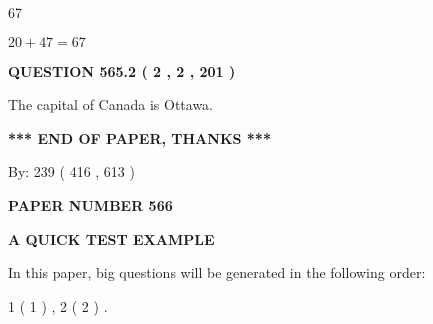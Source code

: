 \documentclass[12pt]{article}
\begin{document}
67
 
 
 
 
\noindent{}

$ %
20 +  %
47=   %
67$
 
 
  
\vspace{0.2in}
  
{\textbf{\Large{QUESTION
565.2 
 ( 2 , 2 , 201 )
}}}
  
  
 
 
\noindent{}
 
 
The capital of Canada is Ottawa.
 
 
 
 
   
   
 \vspace{0.2in}
 
   
   
   
   
\vspace{1.0in} 
{\textbf{\large{ *** END OF PAPER, THANKS *** }}} 
   
   
\hspace{1.0in} By: 
 239 ( 416 ,  613 )
   
   
   
   
\newpage 
\setcounter{page}{ 
   566001 } 
   
   
   
   
 {\textbf{ \Large{ PAPER NUMBER  566  }}}
   
   
\vspace{0.2in}
   
   
   
   
   
   
 \vspace{0.2in}
{\LARGE {\textbf{ A QUICK TEST EXAMPLE}}}
   
   
   
\vspace{0.2in}
   
In this paper, big questions will be generated in the following order: 
   
   
   1 ( 1 )
 ,
   2 ( 2 )
 .
  
\vspace{0.2in}
  
\end{document}
